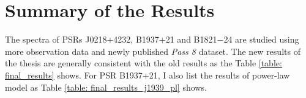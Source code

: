 \documentclass[a4paper, 12pt]{report}
\begin{document}
  \section{Summary of the Results}
    The spectra of PSRs J0218+4232, B1937+21 and B1821$-$24 are studied using more observation 
    data and newly published \textit{Pass 8} dataset. The new results of the thesis are 
    generally consistent with the old results as the Table \ref{table: final_results} shows. 
    For PSR B1937+21, I also list the results of power-law model as Table 
    \ref{table: final_results_j1939_pl} shows.
    \begin{table}[!htp]
      \centering
        \caption[Fit parameters of the spectra model of PSR J0218+4232.]
          {Fit parameters of the spectra model of PSR J0218+4232. 
          The names of parameters are consistent with Equation
          \ref{eq: fermi_model}. The previous results are from  
          \citet{0004-637X-787-2-167,0067-0049-208-2-17}}
        \label{table: final_results}        

    \end{table}  
\end{document}
